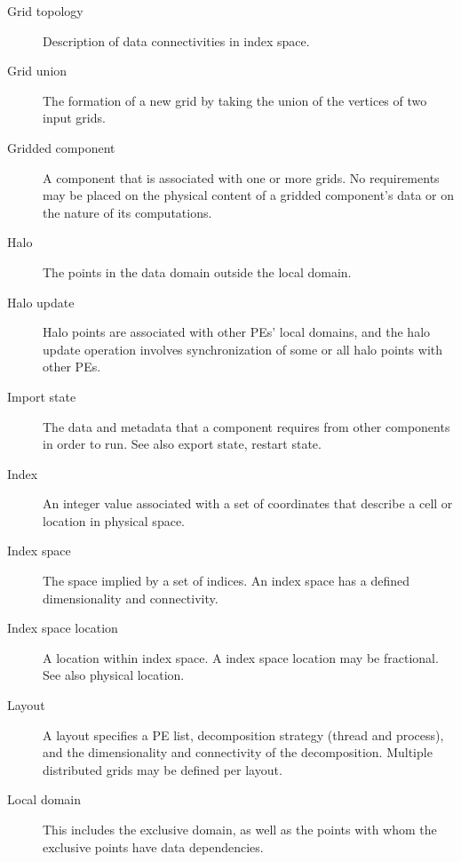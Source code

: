 \begin{description}
\item[Grid topology] \label{glos:GridTopo} Description of data 
  connectivities in index space.

\item[Grid union] \label{glos:GridUnion} The formation of a new grid
  by taking the union of the vertices of two input grids. 

\item[Gridded component] \label{glos:GridComp}
  A component that is associated with one or more grids.  No requirements 
  may be placed on the physical content of a gridded component's data or 
  on the nature of its computations. 

\item[Halo] \label{glos:Halo} 
  The points in the data domain outside the local domain. 

\item[Halo update] \label{glos:HaloUpdate}
  Halo points are associated with other PEs'
  local domains, and the halo update operation involves
  synchronization of some or all halo points with other PEs. 

\item[Import state] \label{glos:ImportState} The data and metadata 
  that a component requires from other components in order to run.  
  See also export state, restart state.

\item[Index] \label{glos:Index} An integer value associated with a set
  of coordinates that describe a cell or location in physical space.

\item[Index space] \label{glos:IndexSpace} The space implied 
  by a set of indices.  An index space has a defined dimensionality and 
  connectivity.

\item[Index space location] \label{glos:IndexSpaceloc} 
  A location within index space.  A index space location may be fractional.
  See also physical location.

\item[Layout] \label{glos:Layout} A layout specifies a PE list, 
  decomposition strategy (thread and process), and the dimensionality 
  and connectivity of the decomposition.  Multiple distributed 
  grids may be defined per layout.

\item[Local domain] \label{glos:LocalDomain} This includes the exclusive 
  domain, as well as the points with whom the exclusive points have data 
  dependencies.


\end{description}
